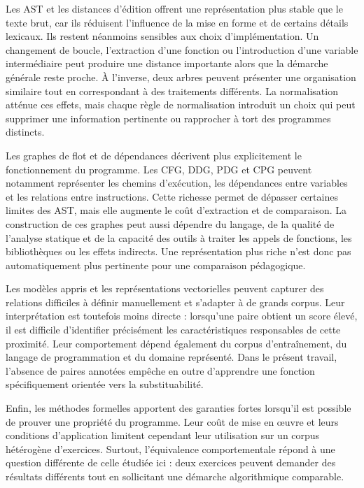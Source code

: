 \documentclass[12pt,a4paper,oneside]{report}
\begin{document}
Les AST et les distances d'édition offrent une représentation plus stable que
le texte brut, car ils réduisent l'influence de la mise en forme et de certains
détails lexicaux. Ils restent néanmoins sensibles aux choix d'implémentation.
Un changement de boucle, l'extraction d'une fonction ou l'introduction d'une
variable intermédiaire peut produire une distance importante alors que la
démarche générale reste proche. À l'inverse, deux arbres peuvent présenter une
organisation similaire tout en correspondant à des traitements différents.
La normalisation atténue ces effets, mais chaque règle de normalisation
introduit un choix qui peut supprimer une information pertinente ou rapprocher
à tort des programmes distincts.

Les graphes de flot et de dépendances décrivent plus explicitement le
fonctionnement du programme. Les CFG, DDG, PDG et CPG peuvent notamment
représenter les chemins d'exécution, les dépendances entre variables et les
relations entre instructions. Cette richesse permet de dépasser certaines
limites des AST, mais elle augmente le coût d'extraction et de comparaison.
La construction de ces graphes peut aussi dépendre du langage, de la qualité
de l'analyse statique et de la capacité des outils à traiter les appels de
fonctions, les bibliothèques ou les effets indirects. Une représentation plus
riche n'est donc pas automatiquement plus pertinente pour une comparaison
pédagogique.

Les modèles appris et les représentations vectorielles peuvent capturer des
relations difficiles à définir manuellement et s'adapter à de grands corpus.
Leur interprétation est toutefois moins directe : lorsqu'une paire obtient un
score élevé, il est difficile d'identifier précisément les caractéristiques
responsables de cette proximité. Leur comportement dépend également du corpus
d'entraînement, du langage de programmation et du domaine représenté. Dans le
présent travail, l'absence de paires annotées empêche en outre d'apprendre une
fonction spécifiquement orientée vers la substituabilité.

Enfin, les méthodes formelles apportent des garanties fortes lorsqu'il est
possible de prouver une propriété du programme. Leur coût de mise en œuvre et
leurs conditions d'application limitent cependant leur utilisation sur un
corpus hétérogène d'exercices. Surtout, l'équivalence comportementale répond à
une question différente de celle étudiée ici : deux exercices peuvent demander
des résultats différents tout en sollicitant une démarche algorithmique
comparable.
\end{document}

